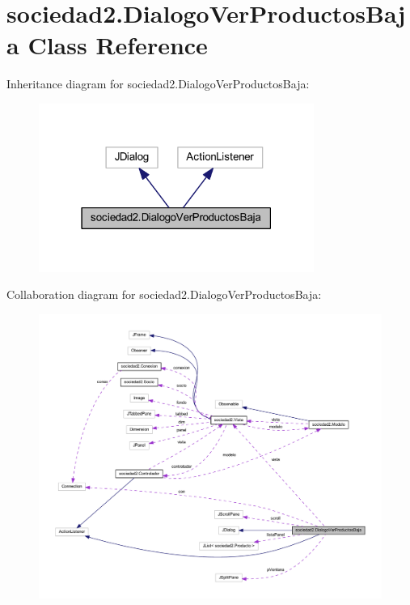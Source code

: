 \hypertarget{classsociedad2_1_1_dialogo_ver_productos_baja}{}\section{sociedad2.\+Dialogo\+Ver\+Productos\+Baja Class Reference}
\label{classsociedad2_1_1_dialogo_ver_productos_baja}


Inheritance diagram for sociedad2.\+Dialogo\+Ver\+Productos\+Baja\+:
\nopagebreak
\begin{figure}[H]
\begin{center}
\leavevmode
\includegraphics[width=255pt]{classsociedad2_1_1_dialogo_ver_productos_baja__inherit__graph}
\end{center}
\end{figure}


Collaboration diagram for sociedad2.\+Dialogo\+Ver\+Productos\+Baja\+:
\nopagebreak
\begin{figure}[H]
\begin{center}
\leavevmode
\includegraphics[width=350pt]{classsociedad2_1_1_dialogo_ver_productos_baja__coll__graph}
\end{center}
\end{figure}
